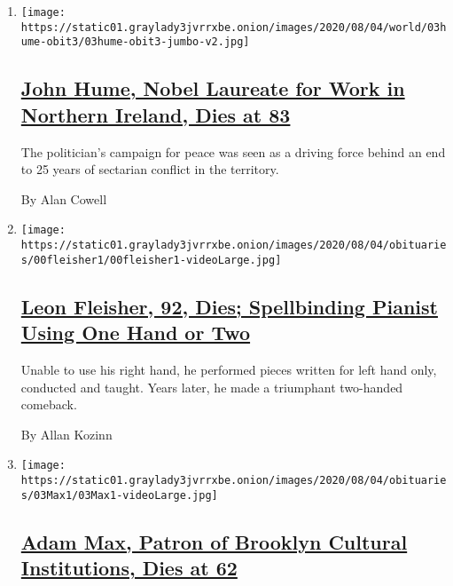 \begin{enumerate}
\def\labelenumi{\arabic{enumi}.}
\item
  \texttt{[image: https://static01.graylady3jvrrxbe.onion/images/2020/08/04/world/03hume-obit3/03hume-obit3-jumbo-v2.jpg]}

  \hypertarget{john-hume-nobel-laureate-for-work-in-northern-ireland-dies-at-83}{%
  \subsection{\texorpdfstring{\href{/2020/08/03/obituaries/john-hume-dies.html}{John
  Hume, Nobel Laureate for Work in Northern Ireland, Dies at
  83}}{John Hume, Nobel Laureate for Work in Northern Ireland, Dies at 83}}\label{john-hume-nobel-laureate-for-work-in-northern-ireland-dies-at-83}}

  The politician's campaign for peace was seen as a driving force behind
  an end to 25 years of sectarian conflict in the territory.

  By Alan Cowell
\item
  \texttt{[image: https://static01.graylady3jvrrxbe.onion/images/2020/08/04/obituaries/00fleisher1/00fleisher1-videoLarge.jpg]}

  \hypertarget{leon-fleisher-92-dies-spellbinding-pianist-using-one-hand-or-two}{%
  \subsection{\texorpdfstring{\href{/2020/08/02/arts/music/leon-fleisher-dead.html}{Leon
  Fleisher, 92, Dies; Spellbinding Pianist Using One Hand or
  Two}}{Leon Fleisher, 92, Dies; Spellbinding Pianist Using One Hand or Two}}\label{leon-fleisher-92-dies-spellbinding-pianist-using-one-hand-or-two}}

  Unable to use his right hand, he performed pieces written for left
  hand only, conducted and taught. Years later, he made a triumphant
  two-handed comeback.

  By Allan Kozinn
\item
  \texttt{[image: https://static01.graylady3jvrrxbe.onion/images/2020/08/04/obituaries/03Max1/03Max1-videoLarge.jpg]}

  \hypertarget{adam-max-patron-of-brooklyn-cultural-institutions-dies-at-62}{%
  \subsection{\texorpdfstring{\href{/2020/08/03/arts/adam-max-patron-of-brooklyn-cultural-institutions-dies-at-62.html}{Adam
  Max, Patron of Brooklyn Cultural Institutions, Dies at
  62}}{Adam Max, Patron of Brooklyn Cultural Institutions, Dies at 62}}\label{adam-max-patron-of-brooklyn-cultural-institutions-dies-at-62}}


\end{enumerate}

